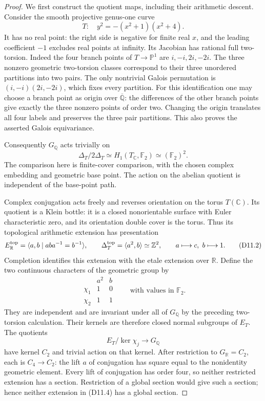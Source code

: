 \begin{proof}
We first construct the quotient maps, including their
arithmetic descent. Consider the smooth projective
genus-one curve
\[
 T:\quad y^2=-(x^2+1)(x^2+4).
\]
It has no real point: the right side is negative for
finite real $x$, and the leading coefficient $-1$
excludes real points at infinity. Its Jacobian has
rational full two-torsion. Indeed the four branch
points of $T\to\mathbb P^1$ are
$i,-i,2i,-2i$. The three nonzero geometric two-torsion
classes correspond to their three unordered partitions
into two pairs. The only nontrivial Galois permutation
is $(i,-i)(2i,-2i)$, which fixes every partition.
For this identification one may choose a branch
point as origin over $\overline{\mathbb Q}$:
the differences of the other branch points give
exactly the three nonzero points of order two.
Changing the origin translates all four labels and
preserves the three pair partitions. This also proves
the asserted Galois equivariance.

Consequently $G_{\mathbb Q}$ acts trivially on
\[
 \Delta_T/2\Delta_T
   \simeq H_1(T_{\mathbb C},\mathbb F_2)
   \simeq(\mathbb F_2)^2 .
\]
The comparison here is finite-cover comparison, with
the chosen complex embedding and geometric base point.
The action on the abelian quotient is independent of
the base-point path.

Complex conjugation acts freely and reverses
orientation on the torus $T(\mathbb C)$. Its quotient
is a Klein bottle: it is a closed nonorientable surface
with Euler characteristic zero, and its orientation
double cover is the torus. Thus its topological
arithmetic extension has presentation
\[
 E_{\mathbb R}^{\rm top}
   =\langle a,b\mid aba^{-1}=b^{-1}\rangle,\qquad
 \Delta_T^{\rm top}=\langle a^2,b\rangle\simeq\mathbb Z^2,
 \qquad a\longmapsto c,\ b\longmapsto1.
 \tag{D11.2}
\]
Completion identifies this extension with the etale
extension over $\mathbb R$. Define the two continuous
characters of the geometric group by
\[
\begin{array}{c|cc}
 &a^2&b\\ \hline
 \chi_1&1&0\\
 \chi_2&1&1
\end{array}
 \qquad\text{with values in }\mathbb F_2 .
 \tag{D11.3}
\]
They are independent and are invariant under all of
$G_{\mathbb Q}$ by the preceding two-torsion calculation.
Their kernels are therefore closed normal subgroups
of $E_T$. The quotients
\[
 E_T/\ker\chi_j\longrightarrow G_{\mathbb Q}
 \tag{D11.4}
\]
have kernel $C_2$ and trivial action on that kernel.
After restriction to $G_{\mathbb R}=C_2$, each is
$C_4\to C_2$: the lift $a$ of conjugation has square
equal to the nonidentity geometric element.
Every lift of conjugation has order four, so neither
restricted extension has a section. Restriction of a
global section would give such a section; hence
neither extension in (D11.4) has a global section.


\end{proof}
